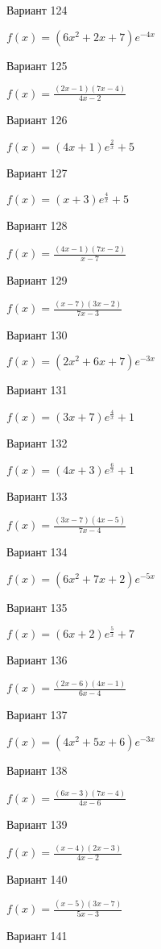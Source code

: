 \documentclass[11pt]{report}
\begin{document}
Вариант 124

$f(x) = \left(6 x^{2} + 2 x + 7\right) e^{- 4 x}$

Вариант 125

$f(x) = \frac{\left(2 x - 1\right) \left(7 x - 4\right)}{4 x - 2}$

Вариант 126

$f(x) = \left(4 x + 1\right) e^{\frac{2}{x}} + 5$

Вариант 127

$f(x) = \left(x + 3\right) e^{\frac{4}{x}} + 5$

Вариант 128

$f(x) = \frac{\left(4 x - 1\right) \left(7 x - 2\right)}{x - 7}$

Вариант 129

$f(x) = \frac{\left(x - 7\right) \left(3 x - 2\right)}{7 x - 3}$

Вариант 130

$f(x) = \left(2 x^{2} + 6 x + 7\right) e^{- 3 x}$

Вариант 131

$f(x) = \left(3 x + 7\right) e^{\frac{4}{x}} + 1$

Вариант 132

$f(x) = \left(4 x + 3\right) e^{\frac{6}{x}} + 1$

Вариант 133

$f(x) = \frac{\left(3 x - 7\right) \left(4 x - 5\right)}{7 x - 4}$

Вариант 134

$f(x) = \left(6 x^{2} + 7 x + 2\right) e^{- 5 x}$

Вариант 135

$f(x) = \left(6 x + 2\right) e^{\frac{5}{x}} + 7$

Вариант 136

$f(x) = \frac{\left(2 x - 6\right) \left(4 x - 1\right)}{6 x - 4}$

Вариант 137

$f(x) = \left(4 x^{2} + 5 x + 6\right) e^{- 3 x}$

Вариант 138

$f(x) = \frac{\left(6 x - 3\right) \left(7 x - 4\right)}{4 x - 6}$

Вариант 139

$f(x) = \frac{\left(x - 4\right) \left(2 x - 3\right)}{4 x - 2}$

Вариант 140

$f(x) = \frac{\left(x - 5\right) \left(3 x - 7\right)}{5 x - 3}$

Вариант 141
\end{document}
